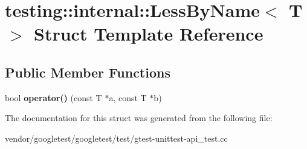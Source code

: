 \hypertarget{structtesting_1_1internal_1_1_less_by_name}{}\section{testing\+:\+:internal\+:\+:Less\+By\+Name$<$ T $>$ Struct Template Reference}
\label{structtesting_1_1internal_1_1_less_by_name}
\subsection*{Public Member Functions}
\begin{DoxyCompactItemize}
\item 
\mbox{\label{structtesting_1_1internal_1_1_less_by_name_a62386ac7750bfc035536be55d90a52eb}} 
bool {\bfseries operator()} (const T $\ast$a, const T $\ast$b)
\end{DoxyCompactItemize}


The documentation for this struct was generated from the following file\+:\begin{DoxyCompactItemize}
\item 
vendor/googletest/googletest/test/gtest-\/unittest-\/api\+\_\+test.\+cc\end{DoxyCompactItemize}
